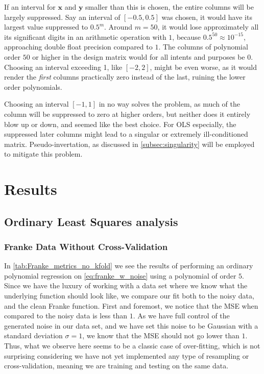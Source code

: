 \documentclass[10pt, twocolumn]{article}
\renewcommand{\b}{\boldsymbol}
\begin{document}
If an interval for $\b x$ and $\b y$ smaller than this is chosen, the entire columns will be largely suppressed. Say an interval of $[-0.5, 0.5]$ was chosen, it would have its largest value suppressed to $0.5^m$. Around $m=50$, it would lose approximately all its significant digits in an arithmetic operation with $1$, because $0.5^{50} \approx 10^{-15}$, approaching double float precision compared to $1$. The columns of polynomial order $50$ or higher in the design matrix would for all intents and purposes be 0. Choosing an interval exceeding 1, like $[-2, 2]$, might be even worse, as it would render the \textit{first} columns practically zero instead of the last, ruining the lower order polynomials.

Choosing an interval $[-1, 1]$ in no way solves the problem, as much of the column will be suppressed to zero at higher orders, but neither does it entirely blow up or down, and seemed like the best choice. For OLS especially, the suppressed later columns might lead to a singular or extremely ill-conditioned matrix. Pseudo-invertation, as discussed in \cref{subsec:singularity} will be employed to mitigate this problem.


\section{Results}
\subsection{Ordinary Least Squares analysis}
\subsubsection{Franke Data Without Cross-Validation}
In \cref{tab:Franke_metrics_no_kfold} we see the results of performing an ordinary polynomial regression on \cref{eq:franke_w_noise} using a polynomial of order $5$. Since we have the luxury of working with a data set where we know what the underlying function should look like, we compare our fit both to the noisy data, and the clean Franke function. First and foremost, we notice that the MSE when compared to the noisy data is less than $1$. As we have full control of the generated noise in our data set, and we have set this noise to be Gaussian with a standard deviation $\sigma=1$, we know that the MSE should not go lower than $1$. Thus, what we observe here seems to be a classic case of over-fitting, which is not surprising considering we have not yet implemented any type of resampling or cross-validation, meaning we are training and testing on the same data.
\end{document}
